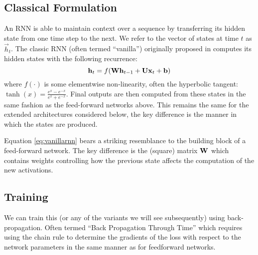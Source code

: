 \subsection{Classical Formulation}
An RNN is able to maintain context over a sequence by transferring its hidden state from one
time step to the next. We refer to the vector of states at time \(t\) as \(\vec{h}_t\).
The classic RNN (often termed ``vanilla'') originally proposed in \autocite{Elman1990}
computes its hidden states with the following recurrence:
\begin{equation}
	\mathbf{h}_t = f(\mathbf{W}\mathbf{h}_{t-1} + \mathbf{U}\mathbf{x}_t +  \mathbf{b})
\label{eq:vanillarnn}
\end{equation} where \(f(\cdot)\) is some elementwise non-linearity, often the hyperbolic tangent:
\(\tanh(x) = \frac{e^{x} - e^{-x}}{e^{x} + e^{-x}}\). Final outputs are then computed from these
states in the same fashion as the feed-forward networks above. This remains the same for the
extended architectures considered below, the key difference is the manner in which the states
are produced.

Equation \eqref{eq:vanillarnn} bears a striking resemblance to the building block of a 
feed-forward network. The key difference is the (square) matrix \(\mathbf{W}\) which contains weights
controlling how the previous state affects the computation of the new activations.

\subsection{Training}
We can train this (or any of the variants we will see subsequently) using back-propagation.
Often termed ``Back Propagation Through Time'' \autocite{Werbos1990} which requires using the
chain rule to determine the gradients of the loss with respect to the network parameters in
the same manner as for feedforward networks.

